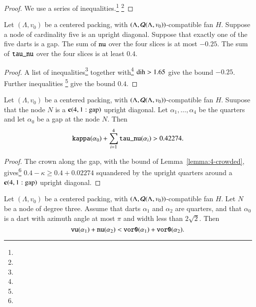 \begin{proof}
We use a series of inequalities.\footnote{} %
\footnote{} %
\end{proof}

\begin{lemma}
\label{lemma:4-crowded}
Let $(\Lambda,v_0)$ be a centered packing, 
with $(\Lambda,{\mathcal Q}(\Lambda,v_0))$-compatible fan $H$.
Suppose a node of cardinality five is an upright diagonal.
Suppose that exactly one of the five darts is a gap.
The sum of ${\operatorname{{\texttt{nu}}}}$ over the four slices is at most
$-0.25$. The sum of ${\operatorname{{\texttt{tau\_nu}}}}$ over the
four slices is at least $0.4$.
\end{lemma}

\begin{proof}
A list of inequalities\footnote{} %
together with\footnote{} %
$\operatorname{dih}>1.65$ give the bound $-0.25$.
Further inequalities \footnote{} %
give the bound $0.4$.  
\end{proof}


\begin{lemma}  
Let $(\Lambda,v_0)$ be a centered packing, 
with $(\Lambda,{\mathcal Q}(\Lambda,v_0))$-compatible fan $H$.
Suupose that the node $N$ is a ${\operatorname{\bf c}}{(4,1:{\operatorname{gap}})}$ upright
diagonal.  Let $\alpha_1,\ldots,\alpha_4$ be the quarters
and let $\alpha_0$ be a gap at the node $N$.  Then
  $$
  {\operatorname{{\texttt{kappa}}}}(\alpha_0) + \sum_{i=1}^4 {\operatorname{{\texttt{tau\_nu}}}}(\alpha_i)
  > 0.42274.
  $$
\end{lemma}

\begin{proof}  The crown along the gap,
with the bound of Lemma~\ref{lemma:4-crowded}, 
gives\footnote{} %
    $0.4-\kappa \ge 0.4+0.02274$
squandered by the upright quarters around a ${\operatorname{\bf c}}{(4,1:{\operatorname{gap}})}$ upright
diagonal.
\end{proof}


\begin{lemma} \label{a:min0-vor} 
Let $(\Lambda,v_0)$ be a centered packing, 
with $(\Lambda,{\mathcal Q}(\Lambda,v_0))$-compatible fan $H$.
Let $N$ be a node of degree three.
Assume that darts $\alpha_1$ and $\alpha_2$ are quarters,
and that $\alpha_0$ is a dart with azimuth angle at most $\pi$ 
and width less than $2\sqrt2$.
Then $${\operatorname{{\texttt{vu}}}}(\alpha_1) + {\operatorname{{\texttt{nu}}}}(\alpha_2) <
     {\operatorname{{\texttt{vor0}}}}(\alpha_1) + {\operatorname{{\texttt{vor0}}}}(\alpha_2).$$
\end{lemma}

